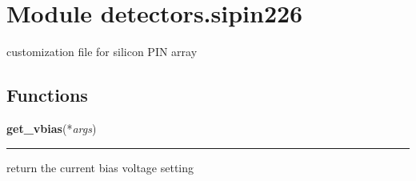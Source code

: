 %
%
%


\section{Module detectors.sipin226}

    \label{detectors:sipin226}
customization file for silicon PIN array



  \subsection{Functions}

    \label{detectors:sipin226:get_vbias}

    \vspace{0.5ex}

    \begin{boxedminipage}{\textwidth}

    \raggedright \textbf{get\_vbias}(*\textit{args})

    \vspace{-1.5ex}

    \rule{\textwidth}{0.5\fboxrule}
    return the current bias voltage setting

    \vspace{1ex}

    \end{boxedminipage}

    \label{detectors:sipin226:set_vbias}

    \vspace{0.5ex}

